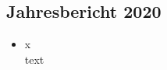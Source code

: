 \subsection{Jahresbericht 2020}
\begin{history}


    \begin{itemize}

        \item[]x\\
        text

    \end{itemize}

\end{history}
